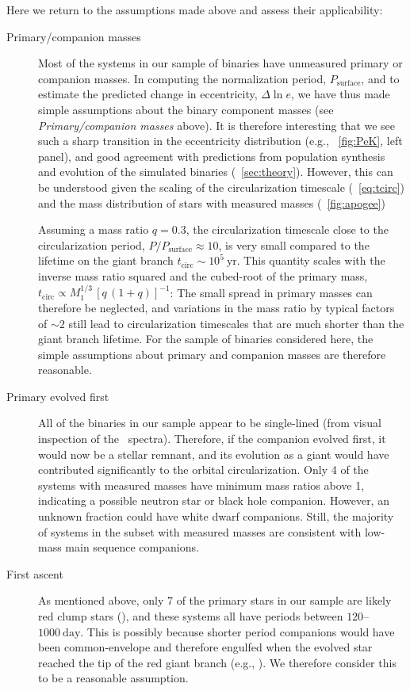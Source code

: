 \documentclass[modern, letterpaper]{aastex62}
\newcommand{\apogee}{\project{\acronym{APOGEE}}}
\newcommand{\Psurf}{\ensuremath{P_\textrm{surface}}}
\begin{document}
Here we return to the assumptions made above and assess their applicability:
\begin{description}
    \item[Primary/companion masses] Most of the systems in our sample of
    binaries have unmeasured primary or companion masses.
    In computing the normalization period, \Psurf, and to estimate the predicted
    change in eccentricity, $\Delta \ln e$, we have thus made simple assumptions
    about the binary component masses (see \emph{Primary/companion masses}
    above).
    It is therefore interesting that we see such a sharp transition in the
    eccentricity distribution (e.g., \figurename~\ref{fig:PeK}, left panel), and
    good agreement with predictions from population synthesis and evolution of
    the simulated binaries (\sectionname~\ref{sec:theory}).
    However, this can be understood given the scaling of the circularization
    timescale (\eqname~\ref{eq:tcirc}) and the mass distribution of stars with
    measured masses (\figurename~\ref{fig:apogee})

    Assuming a mass ratio $q = 0.3$, the circularization timescale close to the
    circularization period, $P / \Psurf \approx 10$, is very small compared to
    the lifetime on the giant branch $t_\textrm{circ} \sim 10^5~\textrm{yr}$.
    This quantity scales with the inverse mass ratio squared and the cubed-root
    of the primary mass, $t_\textrm{circ} \propto M_1^{1/3} \, \left[ q \, (1 +
    q) \right]^{-1}$:
    The small spread in primary masses can therefore be neglected, and
    variations in the mass ratio by typical factors of $\sim 2$ still lead to
    circularization timescales that are much shorter than the giant branch
    lifetime.
    For the sample of binaries considered here, the simple assumptions about
    primary and companion masses are therefore reasonable.
    \item[Primary evolved first] All of the binaries in our sample appear to be
    single-lined (from visual inspection of the \apogee\ spectra).
    Therefore, if the companion evolved first, it would now be a stellar
    remnant, and its evolution as a giant would have contributed significantly
    to the orbital circularization.
    Only 4 of the systems with measured masses have minimum mass ratios above 1,
    indicating a possible neutron star or black hole companion.
    However, an unknown fraction could have white dwarf companions.
    Still, the majority of systems in the subset with measured masses are
    consistent with low-mass main sequence companions.
    \item[First ascent] As mentioned above, only 7 of the primary stars in our
    sample are likely red clump stars (\citealt{Ting:2018}), and these systems
    all have periods between $120$--$1000~\textrm{day}$.
    This is possibly because shorter period companions would have been
    common-envelope and therefore engulfed when the evolved star reached the tip
    of the red giant branch (e.g., \citealt{Nordhaus:2010}).
    We therefore consider this to be a reasonable assumption.
\end{description}
\end{document}

